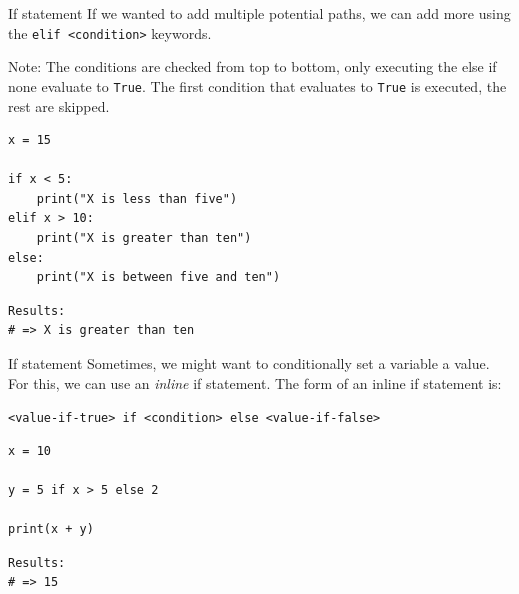 \documentclass[10pt]{beamer}
\begin{document}
\begin{frame}[label={sec:org3d96c7b},fragile]{If statement}
 If we wanted to add multiple potential paths, we can add more using the \texttt{elif
<condition>} keywords.

Note: The conditions are checked from top to bottom, only executing the else if none
evaluate to \texttt{True}. The first condition that evaluates to \texttt{True} is executed, the rest
are skipped.

\begin{verbatim}
x = 15

if x < 5:
    print("X is less than five")
elif x > 10:
    print("X is greater than ten")
else:
    print("X is between five and ten")
\end{verbatim}

\begin{verbatim}
Results: 
# => X is greater than ten
\end{verbatim}
\end{frame}

\begin{frame}[label={sec:orgf9f5f8b},fragile]{If statement}
 Sometimes, we might want to conditionally set a variable a value. For this, we can
use an \emph{inline} if statement. The form of an inline if statement is:

\texttt{<value-if-true> if <condition> else <value-if-false>}

\begin{verbatim}
x = 10

y = 5 if x > 5 else 2

print(x + y)
\end{verbatim}

\begin{verbatim}
Results: 
# => 15
\end{verbatim}
\end{frame}
\end{document}
